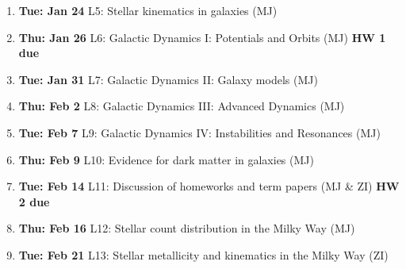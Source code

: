 \documentclass[10pt]{article}
\begin{document}
\begin{enumerate}
  \item {\bf Tue: Jan 24}  L5: Stellar kinematics in galaxies (MJ)
  \item {\bf Thu: Jan 26}  L6: Galactic Dynamics I: Potentials and Orbits (MJ) {\bf HW 1 due}
  \item {\bf Tue: Jan 31}  L7: Galactic Dynamics II: Galaxy models (MJ)
  \item {\bf Thu: Feb 2}   L8: Galactic Dynamics III: Advanced Dynamics (MJ)
  \item {\bf Tue: Feb 7}   L9: Galactic Dynamics IV: Instabilities and Resonances (MJ)
  \item {\bf Thu: Feb 9}   L10: Evidence for dark matter in galaxies (MJ)
  \item {\bf Tue: Feb 14}  L11: Discussion of homeworks and term papers (MJ \& ZI) {\bf HW 2 due}
  \item {\bf Thu: Feb 16}  L12: Stellar count distribution in the Milky Way (MJ)
  \item {\bf Tue: Feb 21}  L13: Stellar metallicity and kinematics in the Milky Way (ZI)

\end{enumerate}
\end{document}
